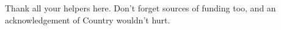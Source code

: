 %
Thank all your helpers here. Don't forget sources of funding too, and an acknowledgement of Country wouldn't hurt. 

